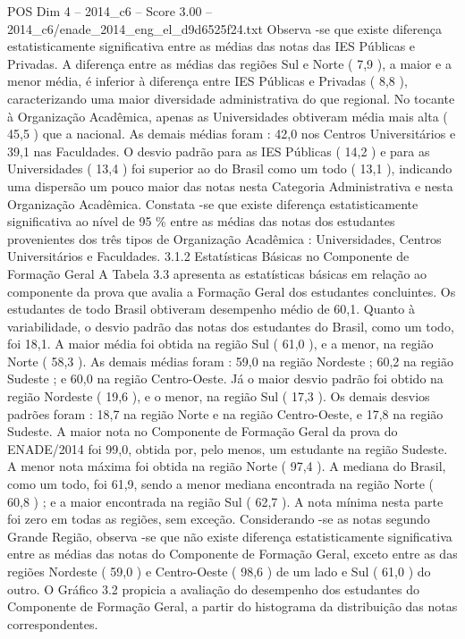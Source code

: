 \begin{textsample}{POS Dim 4 – 2014\_c6 – Score 3.00 – 2014\_c6/enade\_2014\_eng\_el\_d9d6525f24.txt}
Observa -se que existe diferença estatisticamente significativa entre as médias das notas das IES Públicas e Privadas.
A diferença entre as médias das regiões Sul e Norte ( 7,9 ), a maior e a menor média, é inferior à diferença entre IES Públicas e Privadas ( 8,8 ), caracterizando uma maior diversidade administrativa do que regional.
No tocante à Organização Acadêmica, apenas as Universidades obtiveram média mais alta ( 45,5 ) que a nacional.
As demais médias foram : 42,0 nos Centros Universitários e 39,1 nas Faculdades.
O desvio padrão para as IES Públicas ( 14,2 ) e para as Universidades ( 13,4 ) foi superior ao do Brasil como um todo ( 13,1 ), indicando uma dispersão um pouco maior das notas nesta Categoria Administrativa e nesta Organização Acadêmica.
Constata -se que existe diferença estatisticamente significativa ao nível de 95 \% entre as médias das notas dos estudantes provenientes dos três tipos de Organização Acadêmica : Universidades, Centros Universitários e Faculdades. 3.1.2 Estatísticas Básicas no Componente de Formação Geral A Tabela 3.3 apresenta as estatísticas básicas em relação ao componente da prova que avalia a Formação Geral dos estudantes concluintes.
Os estudantes de todo Brasil obtiveram desempenho médio de 60,1.
Quanto à variabilidade, o desvio padrão das notas dos estudantes do Brasil, como um todo, foi 18,1.
A maior média foi obtida na região Sul ( 61,0 ), e a menor, na região Norte ( 58,3 ).
As demais médias foram : 59,0 na região Nordeste ; 60,2 na região Sudeste ; e 60,0 na região Centro-Oeste.
Já o maior desvio padrão foi obtido na região Nordeste ( 19,6 ), e o menor, na região Sul ( 17,3 ).
Os demais desvios padrões foram : 18,7 na região Norte e na região Centro-Oeste, e 17,8 na região Sudeste.
A maior nota no Componente de Formação Geral da prova do ENADE/2014 foi 99,0, obtida por, pelo menos, um estudante na região Sudeste.
A menor nota máxima foi obtida na região Norte ( 97,4 ).
A mediana do Brasil, como um todo, foi 61,9, sendo a menor mediana encontrada na região Norte ( 60,8 ) ; e a maior encontrada na região Sul ( 62,7 ).
A nota mínima nesta parte foi zero em todas as regiões, sem exceção.
Considerando -se as notas segundo Grande Região, observa -se que não existe diferença estatisticamente significativa entre as médias das notas do Componente de Formação Geral, exceto entre as das regiões Nordeste ( 59,0 ) e Centro-Oeste ( 98,6 ) de um lado e Sul ( 61,0 ) do outro.
O Gráfico 3.2 propicia a avaliação do desempenho dos estudantes do Componente de Formação Geral, a partir do histograma da distribuição das notas correspondentes.

\end{textsample}
